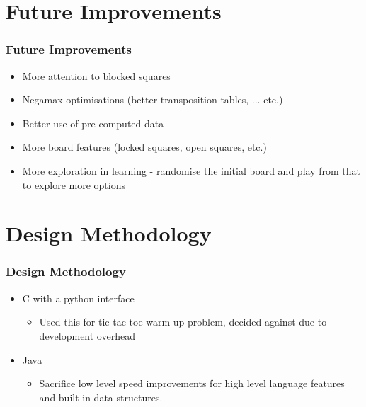 \documentclass[10pt]{beamer}
\newcommand{\bcen}{\begin{center}}
\newcommand{\ecen}{\end{center}}
\begin{document}
\section{Future Improvements}

\begin{frame}
  \frametitle{Future Improvements}
  \begin{itemize}
  \item<1-> More attention to blocked squares
  \item<2-> Negamax optimisations (better transposition tables, ... etc.)
  \item<3-> Better use of pre-computed data
  \item<4-> More board features (locked squares, open squares, etc.)
  \item<5-> More exploration in learning - randomise the initial board and play from that to explore more options
  \end{itemize}
\end{frame}

\section{Design Methodology}

\begin{frame}
\frametitle{Design Methodology}
  \bcen
  \begin{itemize}
  \item<1-> C with a python interface
      \begin{itemize}
        \item<1-> Used this for tic-tac-toe warm up problem, decided against due to development overhead 
      \end{itemize}
  \item<2-> Java
      \begin{itemize}
        \item<2->  Sacrifice low level speed improvements for high level language features and built in data structures.
      \end{itemize}
  \end{itemize}
  \ecen
\end{frame}
\end{document}

